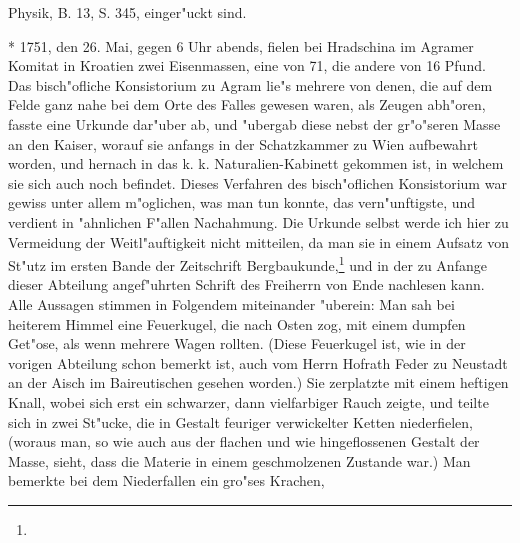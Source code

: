 \documentclass[a4paper, 11pt, oneside, polutonikogreek, german]{article}
\begin{document}
Physik, B. 13, S. 345, einger"uckt sind.

* 1751, den 26. Mai, gegen 6 Uhr abends, fielen bei Hradschina im Agramer Komitat in Kroatien zwei Eisenmassen, eine von 71, die andere von 16 Pfund. Das bisch"ofliche Konsistorium zu Agram lie"s mehrere von denen, die auf dem Felde ganz nahe bei dem Orte des Falles gewesen waren, als Zeugen abh"oren, fasste eine Urkunde dar"uber ab, und "ubergab diese nebst der gr"o"seren Masse an den Kaiser, worauf sie anfangs in der Schatzkammer zu Wien aufbewahrt worden, und hernach in das k. k. Naturalien-Kabinett gekommen ist, in welchem sie sich auch noch befindet. Dieses Verfahren des bisch"oflichen Konsistorium war gewiss unter allem m"oglichen, was man tun konnte, das vern"unftigste, und verdient in "ahnlichen F"allen Nachahmung. Die Urkunde selbst werde ich hier zu Vermeidung der Weitl"auftigkeit nicht mitteilen, da man sie in einem Aufsatz von St"utz im ersten Bande der Zeitschrift Bergbaukunde,\footnote{} und in der zu Anfange dieser Abteilung angef"uhrten Schrift des Freiherrn von Ende nachlesen kann. Alle Aussagen stimmen in Folgendem miteinander "uberein: Man sah bei heiterem Himmel eine Feuerkugel, die nach Osten zog, mit einem dumpfen Get"ose, als wenn mehrere Wagen rollten. (Diese Feuerkugel ist, wie in der vorigen Abteilung schon bemerkt ist, auch vom Herrn Hofrath Feder zu Neustadt an der Aisch im Baireutischen gesehen worden.) Sie zerplatzte mit einem heftigen Knall, wobei sich erst ein schwarzer, dann vielfarbiger Rauch zeigte, und teilte sich in zwei St"ucke, die in Gestalt feuriger verwickelter Ketten niederfielen, (woraus man, so wie auch aus der flachen und wie hingeflossenen Gestalt der Masse, sieht, dass die Materie in einem geschmolzenen Zustande war.) Man bemerkte bei dem Niederfallen ein gro"ses Krachen, 
\end{document}
